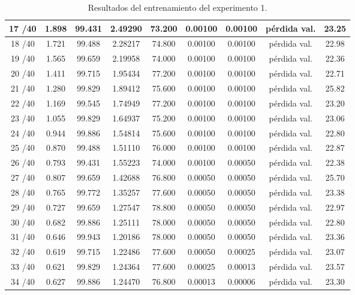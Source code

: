 \begin{table}[ht]
\begin{tabular}{|c|c|c|c|c|c|c|c|c|}
        17 /40 & 1.898  & 99.431 & 2.49290 & 73.200 & 0.00100 & 0.00100 & pérdida val. & 23.25  \\ \hline
        18 /40 & 1.721  & 99.488 & 2.28217 & 74.800 & 0.00100 & 0.00100 & pérdida val. & 22.98  \\ \hline
        19 /40 & 1.565  & 99.659 & 2.19958 & 74.000 & 0.00100 & 0.00100 & pérdida val. & 22.36  \\ \hline
        20 /40 & 1.411  & 99.715 & 1.95434 & 77.200 & 0.00100 & 0.00100 & pérdida val. & 22.71  \\ \hline
        21 /40 & 1.280  & 99.829 & 1.89412 & 75.600 & 0.00100 & 0.00100 & pérdida val. & 25.82  \\ \hline
        22 /40 & 1.169  & 99.545 & 1.74949 & 77.200 & 0.00100 & 0.00100 & pérdida val. & 23.20  \\ \hline
        23 /40 & 1.055  & 99.829 & 1.64937 & 75.200 & 0.00100 & 0.00100 & pérdida val. & 23.06  \\ \hline
        24 /40 & 0.944  & 99.886 & 1.54814 & 75.600 & 0.00100 & 0.00100 & pérdida val. & 22.80  \\ \hline
        25 /40 & 0.870  & 99.488 & 1.51110 & 76.000 & 0.00100 & 0.00100 & pérdida val. & 22.87  \\ \hline
        26 /40 & 0.793  & 99.431 & 1.55223 & 74.000 & 0.00100 & 0.00050 & pérdida val. & 22.38  \\ \hline
        27 /40 & 0.807  & 99.659 & 1.42688 & 76.800 & 0.00050 & 0.00050 & pérdida val. & 25.70  \\ \hline
        28 /40 & 0.765  & 99.772 & 1.35257 & 77.600 & 0.00050 & 0.00050 & pérdida val. & 23.38  \\ \hline
        29 /40 & 0.727  & 99.659 & 1.27547 & 78.800 & 0.00050 & 0.00050 & pérdida val. & 22.97  \\ \hline
        30 /40 & 0.682  & 99.886 & 1.25111 & 78.000 & 0.00050 & 0.00050 & pérdida val. & 22.80  \\ \hline
        31 /40 & 0.646  & 99.943 & 1.20186 & 78.000 & 0.00050 & 0.00050 & pérdida val. & 23.36  \\ \hline
        32 /40 & 0.619  & 99.715 & 1.22486 & 77.600 & 0.00050 & 0.00025 & pérdida val. & 23.07  \\ \hline
        33 /40 & 0.621  & 99.829 & 1.24364 & 77.600 & 0.00025 & 0.00013 & pérdida val. & 23.57  \\ \hline
        34 /40 & 0.627  & 99.886 & 1.24470 & 76.800 & 0.00013 & 0.00006 & pérdida val. & 23.30  \\ \hline
        \end{tabular}
        \caption{Resultados del entrenamiento del experimento 1.}
        \label{tab:training_results_b1}
        \end{table}

